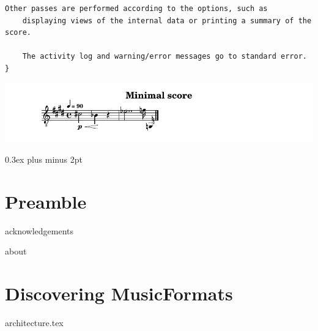 \documentclass[11pt,a4paper]{report}
\begin{document}
\begin{titlepage}
\begin{center}
\begin{turn}{1}
{\begin{minipage}{\linewidth}
\begin{lstlisting}[language=Terminal]
    Other passes are performed according to the options, such as
    displaying views of the internal data or printing a summary of the score.

    The activity log and warning/error messages go to standard error.
}\end{lstlisting} %
\end{minipage}
}
\end{turn}

    \vspace{.5cm}

\includegraphics[scale=1.0]{../graphics/MinimalScore.png}

  \vfill

  \end{center}
\end{titlepage}


{ %
  \setlength {\parskip} {0.3ex plus \baselineskip minus 2pt}

  \tableofcontents

  \listoffigures
}


\part{Preamble}

{acknowledgements}

\fancyhead[L]{\nouppercase\leftmark}
\fancyhead[C]{}
\fancyhead[R]{\nouppercase\rightmark}

{about}


\part{Discovering MusicFormats}

{architecture.tex}
\end{document}
